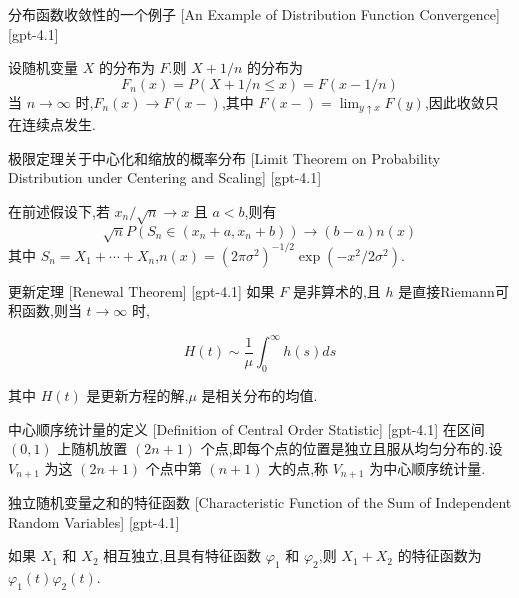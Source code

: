 \documentclass[UTF8]{ctexart}
\begin{document}
    
    
    \begin{xmp}
        {分布函数收敛性的一个例子}
        [An Example of Distribution Function Convergence]
        [gpt-4.1]
        
设随机变量 $X$ 的分布为 $F$.则 $X + 1/n$ 的分布为
\[
F_{n}(x) = P(X + 1/n \leq x) = F(x - 1/n)
\]
当 $n \to \infty$ 时,$F_{n}(x) \to F(x-)$,其中 $F(x-) = \operatorname*{lim}_{y \uparrow x} F(y)$,因此收敛只在连续点发生.

    \end{xmp}
    
    
    
    \begin{thm}
        {极限定理关于中心化和缩放的概率分布}
        [Limit Theorem on Probability Distribution under Centering and Scaling]
        [gpt-4.1]
        
在前述假设下,若 $x_{n} / \sqrt{n} \to x$ 且 $a < b$,则有
\[
\sqrt{n} P(S_{n} \in (x_{n} + a, x_{n} + b)) \to (b - a) n(x)
\]
其中 $S_n = X_1 + \cdots + X_n$,$n(x) = (2\pi\sigma^2)^{-1/2} \exp(-x^2/2\sigma^2)$.

    \end{thm}
    
    
    
    \begin{thm}
        {更新定理}
        [Renewal Theorem]
        [gpt-4.1]
        如果 $F$ 是非算术的,且 $h$ 是直接Riemann可积函数,则当 $t \to \infty$ 时,

\[
H(t) \sim \frac{1}{\mu} \int_{0}^{\infty} h(s) ds
\]

其中 $H(t)$ 是更新方程的解,$\mu$ 是相关分布的均值.
    \end{thm}
    
    
    
    \begin{dfn}
        {中心顺序统计量的定义}
        [Definition of Central Order Statistic]
        [gpt-4.1]
        在区间 $(0,1)$ 上随机放置 $(2n+1)$ 个点,即每个点的位置是独立且服从均匀分布的.设 $V_{n+1}$ 为这 $(2n+1)$ 个点中第 $(n+1)$ 大的点,称 $V_{n+1}$ 为中心顺序统计量.
    \end{dfn}
    
    
    
    \begin{thm}
        {独立随机变量之和的特征函数}
        [Characteristic Function of the Sum of Independent Random Variables]
        [gpt-4.1]
        
如果 $X_{1}$ 和 $X_{2}$ 相互独立,且具有特征函数 $\varphi_{1}$ 和 $\varphi_{2}$,则 $X_{1} + X_{2}$ 的特征函数为 $\varphi_{1}(t) \varphi_{2}(t)$.

    \end{thm}
    
\end{document}
